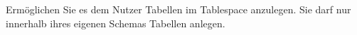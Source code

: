     \item Ermöglichen Sie es dem Nutzer  Tabellen im Tablespace  anzulegen. Sie darf nur innerhalb ihres eigenen Schemas Tabellen anlegen.
